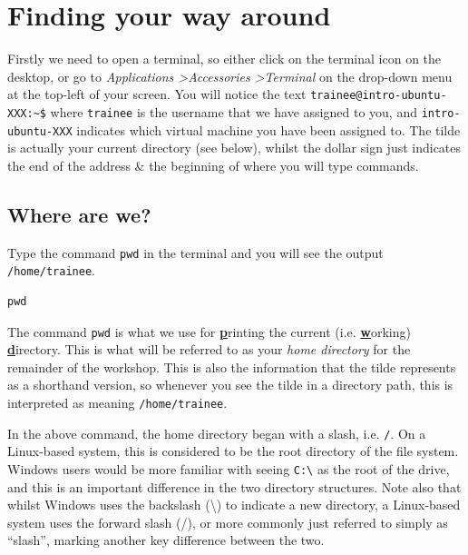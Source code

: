 \documentclass[a4paper,12pt,twoside]{memoir}
\begin{document}
\clearpage
\section{Finding your way around}
\begin{information}
Firstly we need to open a terminal, so either click on the terminal icon on the desktop, or go to \textit{Applications \textgreater Accessories \textgreater Terminal} on the drop-down menu at the top-left of your screen.
You will notice the text \texttt{trainee@intro-ubuntu-XXX:\~{}\$} where \texttt{trainee} is the username that we have assigned to you, and \texttt{intro-ubuntu-XXX} indicates which virtual machine you have been assigned to.
The tilde is actually your current directory (see below), whilst the dollar sign just indicates the end of the address \& the beginning of where you will type commands. \\
\end{information}

\subsection{Where are we?}
\begin{steps}
Type the command \texttt{pwd} in the terminal and you will see the output \texttt{/home/trainee}.
\begin{lstlisting}
pwd
\end{lstlisting}
The command \texttt{pwd} is what we use for \underline{\textbf{p}}rinting the current (i.e. \underline{\textbf{w}}orking) \underline{\textbf{d}}irectory.
This is what will be referred to as your \textit{home directory} for the remainder of the workshop.
This is also the information that the tilde represents as a shorthand version, so whenever you see the tilde in a directory path, this is interpreted as meaning \texttt{/home/trainee}. \\
\end{steps}

\begin{information}
In the above command, the home directory began with a slash, i.e. \texttt{/}.
On a Linux-based system, this is considered to be the root directory of the file system. 
Windows users would be more familiar with seeing \texttt{C:\textbackslash} as the root of the drive, and this is an important difference in the two directory structures.
Note also that whilst Windows uses the backslash (\textbackslash) to indicate a new directory, a Linux-based system uses the forward slash (/), or more commonly just referred to simply as ``slash'', marking another key difference between the two. \\
\end{information}
\end{document}
